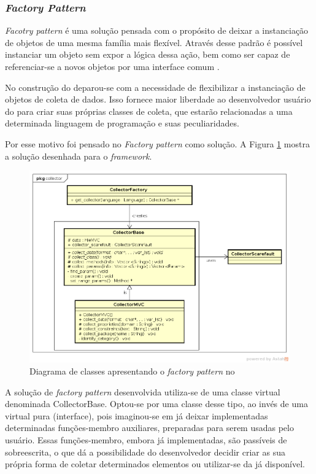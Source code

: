 \subsubsection{\textit{Factory Pattern}}
\textit{Facotry pattern} é uma solução pensada com o propósito de deixar a
instanciação de objetos de uma mesma família mais flexível. Através desse
padrão  é possível instanciar um objeto sem expor a lógica dessa ação, bem
como ser capaz de referenciar-se a novos objetos por uma interface comum
\cite{gammaEtAl1994}.

No construção do \scarefault deparou-se com a necessidade de flexibilizar
a instanciação de objetos de coleta de dados. Isso fornece maior liberdade
ao desenvolvedor usuário do \framework para criar suas próprias classes de
coleta, que estarão relacionadas a uma determinada linguagem de programação
e suas peculiaridades.

Por esse motivo foi pensado no \textit{Factory pattern} como solução. A Figura
\ref{collector-diagram} mostra a solução desenhada para o \textit{framework}.
\begin{figure}[h]
  \centering
    \includegraphics[width=\textwidth]{figuras/collector-diagram.png}
    \caption{Diagrama de classes apresentando o \textit{factory pattern} no \framework}
    \label{collector-diagram}
\end{figure}
\FloatBarrier

A solução de \textit{factory pattern} desenvolvida utiliza-se de uma classe
\textsf{virtual} denominada \textsf{CollectorBase}. Optou-se por uma classe
desse tipo, ao invés de uma \textsf{virtual} pura (\textsf{interface}), pois
imaginou-se em já deixar implementadas determinadas funções-membro auxiliares,
preparadas para serem usadas pelo usuário. Essas funções-membro, embora já implementadas,
são passíveis de sobreescrita, o que dá a possibilidade do desenvolvedor
decidir criar as sua própria forma de coletar determinados elementos ou utilizar-se
da já disponível.

